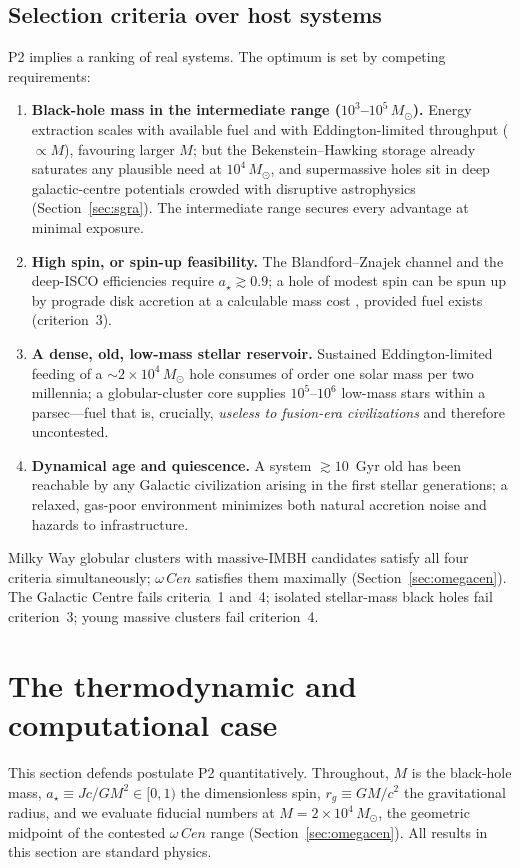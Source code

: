 \documentclass[11pt]{article}
\newcommand{\msun}{M_\odot}
\newcommand{\acen}{\ensuremath{\omega}\,Cen}
\newcommand{\astar}{a_\star}
\begin{document}
\subsection{Selection criteria over host systems}\label{sec:selection}
P2 implies a ranking of real systems. The optimum is set by competing requirements:
\begin{enumerate}[leftmargin=1.4em]
\item \textbf{Black-hole mass in the intermediate range ($10^{3}$--$10^{5}\,\msun$).} Energy extraction scales with available fuel and with Eddington-limited throughput ($\propto M$), favouring larger $M$; but the Bekenstein--Hawking storage already saturates any plausible need at $10^{4}\,\msun$, and supermassive holes sit in deep galactic-centre potentials crowded with disruptive astrophysics (Section~\ref{sec:sgra}). The intermediate range secures every advantage at minimal exposure.
\item \textbf{High spin, or spin-up feasibility.} The Blandford--Znajek channel and the deep-ISCO efficiencies require $\astar \gtrsim 0.9$; a hole of modest spin can be spun up by prograde disk accretion at a calculable mass cost \citep{thorne1974}, provided fuel exists (criterion~3).
\item \textbf{A dense, old, low-mass stellar reservoir.} Sustained Eddington-limited feeding of a ${\sim}2\times10^{4}\,\msun$ hole consumes of order one solar mass per two millennia; a globular-cluster core supplies $10^{5}$--$10^{6}$ low-mass stars within a parsec---fuel that is, crucially, \emph{useless to fusion-era civilizations} and therefore uncontested.
\item \textbf{Dynamical age and quiescence.} A system $\gtrsim 10$~Gyr old has been reachable by any Galactic civilization arising in the first stellar generations; a relaxed, gas-poor environment minimizes both natural accretion noise and hazards to infrastructure.
\end{enumerate}
Milky Way globular clusters with massive-IMBH candidates satisfy all four criteria simultaneously; $\acen$ satisfies them maximally (Section~\ref{sec:omegacen}). The Galactic Centre fails criteria~1 and~4; isolated stellar-mass black holes fail criterion~3; young massive clusters fail criterion~4.

\section{The thermodynamic and computational case}\label{sec:thermo}
This section defends postulate P2 quantitatively. Throughout, $M$ is the black-hole mass, $\astar \equiv Jc/GM^{2} \in [0,1)$ the dimensionless spin, $r_g \equiv GM/c^{2}$ the gravitational radius, and we evaluate fiducial numbers at $M = 2\times10^{4}\,\msun$, the geometric midpoint of the contested $\acen$ range (Section~\ref{sec:omegacen}). All results in this section are standard physics.
\end{document}
